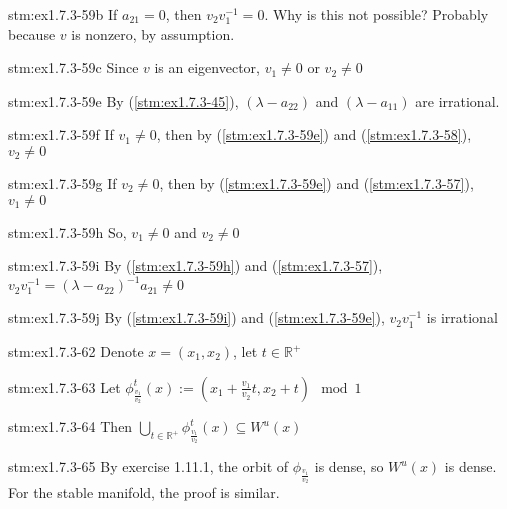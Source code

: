 \begin{explanation}{stm:ex1.7.3-59b}
If $a_{21} = 0$, then $v_2 v_1^{-1} = 0$. Why is this not possible? Probably because $v$ is nonzero, by assumption.
\end{explanation}

\begin{statement}{stm:ex1.7.3-59c}
Since $v$ is an eigenvector, $v_1 \ne 0$ or $v_2 \ne 0$
\end{statement}

\begin{statement}{stm:ex1.7.3-59e}
By (\ref{stm:ex1.7.3-45}), $(\lambda - a_{22})$ and $(\lambda - a_{11})$ are irrational.
\end{statement}

\begin{statement}{stm:ex1.7.3-59f}
If $v_1 \ne 0$, then by (\ref{stm:ex1.7.3-59e}) and (\ref{stm:ex1.7.3-58}), $v_2 \ne 0$
\end{statement}

\begin{statement}{stm:ex1.7.3-59g}
If $v_2 \ne 0$, then by (\ref{stm:ex1.7.3-59e}) and (\ref{stm:ex1.7.3-57}), $v_1 \ne 0$
\end{statement}

\begin{statement}{stm:ex1.7.3-59h}
So, $v_1 \ne 0$ and $v_2 \ne 0$
\end{statement}

\begin{statement}{stm:ex1.7.3-59i}
By (\ref{stm:ex1.7.3-59h}) and (\ref{stm:ex1.7.3-57}), $v_2 v_1^{-1} = (\lambda - a_{22})^{-1} a_{21} \ne 0$
\end{statement}

\begin{statement}{stm:ex1.7.3-59j}
By (\ref{stm:ex1.7.3-59i}) and (\ref{stm:ex1.7.3-59e}), $v_2 v_1^{-1}$ is irrational
\end{statement}

\begin{statement}{stm:ex1.7.3-62}
Denote $x = (x_1, x_2)$, let $t \in \mathbb{R}^+$
\end{statement}

\begin{statement}{stm:ex1.7.3-63}
Let $\phi_{\frac{v_1}{v_2}}^t(x) := (x_1 + \frac{v_1}{v_2} t, x_2 + t) \mod 1$
\end{statement}

\begin{statement}{stm:ex1.7.3-64}
Then $\bigcup_{t \in \mathbb{R}^+} \phi_{\frac{v_1}{v_2}}^t(x) \subseteq W^u(x)$
\end{statement}

\begin{statement}{stm:ex1.7.3-65}
By exercise 1.11.1, the orbit of $\phi_{\frac{v_1}{v_2}}$ is dense, so $W^u(x)$ is dense. For the stable manifold, the proof is similar.
\end{statement}
